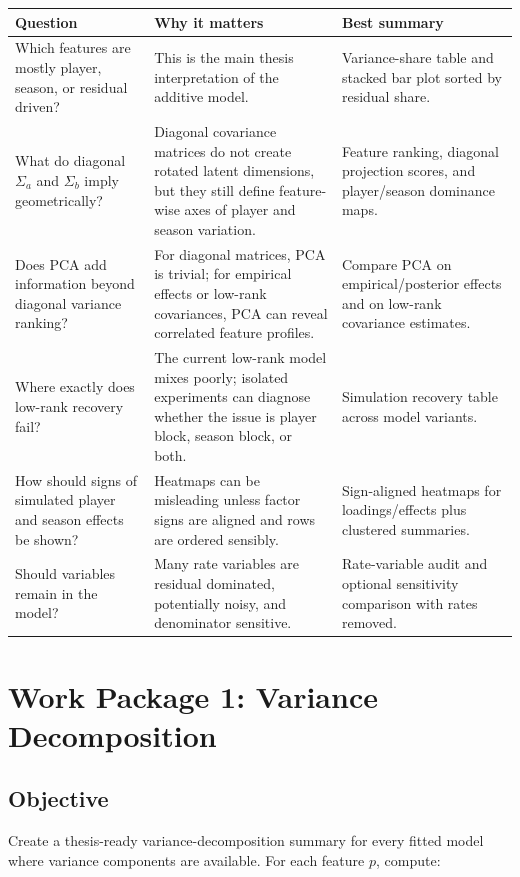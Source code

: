 \documentclass[11pt]{article}
\newcommand{\code}[1]{\texttt{\detokenize{#1}}}
\begin{document}
\begin{longtable}{L{0.27\textwidth}L{0.37\textwidth}L{0.27\textwidth}}
\toprule
Question & Why it matters & Best summary \\
\midrule
\endhead
Which features are mostly player, season, or residual driven? &
This is the main thesis interpretation of the additive model. &
Variance-share table and stacked bar plot sorted by residual share. \\
\addlinespace
What do diagonal \(\Sigma_a\) and \(\Sigma_b\) imply geometrically? &
Diagonal covariance matrices do not create rotated latent dimensions, but they
still define feature-wise axes of player and season variation. &
Feature ranking, diagonal projection scores, and player/season dominance maps. \\
\addlinespace
Does PCA add information beyond diagonal variance ranking? &
For diagonal matrices, PCA is trivial; for empirical effects or low-rank
covariances, PCA can reveal correlated feature profiles. &
Compare PCA on empirical/posterior effects and on low-rank covariance estimates. \\
\addlinespace
Where exactly does low-rank recovery fail? &
The current low-rank model mixes poorly; isolated experiments can diagnose
whether the issue is player block, season block, or both. &
Simulation recovery table across model variants. \\
\addlinespace
How should signs of simulated player and season effects be shown? &
Heatmaps can be misleading unless factor signs are aligned and rows are ordered
sensibly. &
Sign-aligned heatmaps for loadings/effects plus clustered summaries. \\
\addlinespace
Should \code{rate_*} variables remain in the model? &
Many rate variables are residual dominated, potentially noisy, and denominator
sensitive. &
Rate-variable audit and optional sensitivity comparison with rates removed. \\
\bottomrule
\end{longtable}

\section{Work Package 1: Variance Decomposition}

\subsection{Objective}

Create a thesis-ready variance-decomposition summary for every fitted model
where variance components are available. For each feature \(p\), compute:
\end{document}
